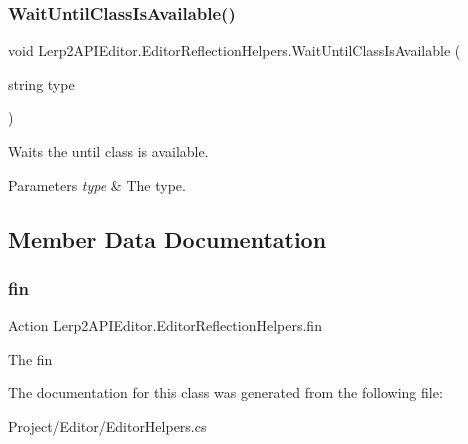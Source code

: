 \subsubsection{\texorpdfstring{Wait\+Until\+Class\+Is\+Available()}{WaitUntilClassIsAvailable()}}
{\footnotesize\ttfamily void Lerp2\+A\+P\+I\+Editor.\+Editor\+Reflection\+Helpers.\+Wait\+Until\+Class\+Is\+Available (\begin{DoxyParamCaption}\item[{string}]{type }\end{DoxyParamCaption})\hspace{0.3cm}{\ttfamily [inline]}}



Waits the until class is available. 


\begin{DoxyParams}{Parameters}
{\em type} & The type.\\
\hline
\end{DoxyParams}


\subsection{Member Data Documentation}
\mbox{\label{class_lerp2_a_p_i_editor_1_1_editor_reflection_helpers_ae242808119aa1d686b7864e255e44b4f}} 
\subsubsection{\texorpdfstring{fin}{fin}}
{\footnotesize\ttfamily Action Lerp2\+A\+P\+I\+Editor.\+Editor\+Reflection\+Helpers.\+fin}



The fin 



The documentation for this class was generated from the following file\+:\begin{DoxyCompactItemize}
\item 
Project/\+Editor/Editor\+Helpers.\+cs\end{DoxyCompactItemize}
